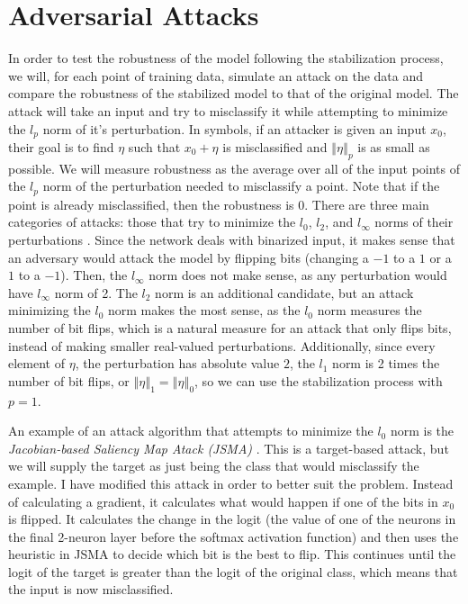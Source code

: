 \documentclass{article}
\newcommand{\norm}[1]{\left\Vert #1 \right\Vert}
\DeclareMathOperator{\1}{\mathbb{1}}
\begin{document}
\section{Adversarial Attacks}

In order to test the robustness of the model following the stabilization process, we will, for each point of training data, simulate an attack on the data and compare the robustness of the stabilized model to that of the original model. The attack will take an input and try to misclassify it while attempting to minimize the $l_p$ norm of it's perturbation. In symbols, if an attacker is given an input $x_0$, their goal is to find $\eta$ such that $x_0 + \eta$ is misclassified and $\norm{\eta}_p$ is as small as possible. We will measure robustness as the average over all of the input points of the $l_p$ norm of the perturbation needed to misclassify a point. Note that if the point is already misclassified, then the robustness is 0. There are three main categories of attacks: those that try to minimize the $l_0$, $l_2$, and $l_\infty$ norms of their perturbations \cite[p.~113]{vorobook}. Since the network deals with binarized input, it makes sense that an adversary would attack the model by flipping bits (changing a $-1$ to a $1$ or a $1$ to a $-1$). Then, the $l_\infty$ norm does not make sense, as any perturbation would have $l_\infty$ norm of 2. The $l_2$ norm is an additional candidate, but an attack minimizing the $l_0$ norm makes the most sense, as the $l_0$ norm measures the number of bit flips, which is a natural measure for an attack that only flips bits, instead of making smaller real-valued perturbations. Additionally, since every element of $\eta$, the perturbation has absolute value $2$, the $l_1$ norm is 2 times the number of bit flips, or $\norm{\eta}_1 = \norm{\eta}_0$, so we can use the stabilization process with $p = 1$.

An example of an attack algorithm that attempts to minimize the $l_0$ norm is the \textit{Jacobian-based Saliency Map Atack (JSMA)} \cite{papernot} \cite[p.~4]{ecocpaper}. This is a target-based attack, but we will supply the target as just being the class that would misclassify the example. I have modified this attack in order to better suit the problem. Instead of calculating a gradient, it calculates what would happen if one of the bits in $x_0$ is flipped. It calculates the change in the logit (the value of one of the neurons in the final 2-neuron layer before the softmax activation function) and then uses the heuristic in JSMA to decide which bit is the best to flip. This continues until the logit of the target is greater than the logit of the original class, which means that the input is now misclassified.
\end{document}
